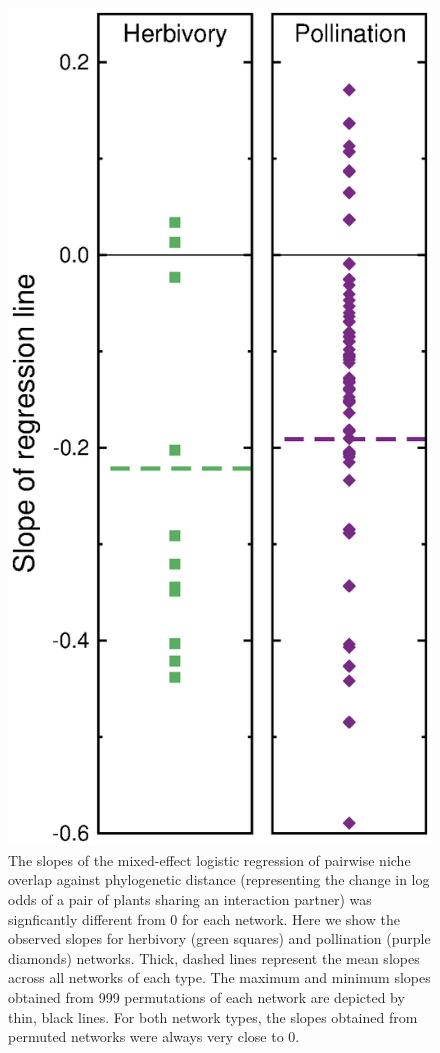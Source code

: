 \documentclass[12pt]{article}
\begin{document}
  \begin{figure}[!h]
    \begin{center}
      \centerline{\includegraphics*[height=.75\textwidth]{Figures/dataplots/observed_vs_random.eps}}
    \end{center}
     \caption{The slopes of the mixed-effect logistic regression of pairwise niche overlap against phylogenetic distance (representing the change in log odds of a pair of plants sharing an interaction partner) was signficantly different from 0 for each network. Here we show the observed slopes for herbivory (green squares) and pollination (purple diamonds) networks. Thick, dashed lines represent the mean slopes across all networks of each type. The maximum and minimum slopes obtained from 999 permutations of each network are depicted by thin, black lines. For both network types, the slopes obtained from permuted networks were always very close to 0. }
    \label{obs_vs_random} 
  \end{figure}
\end{document}
